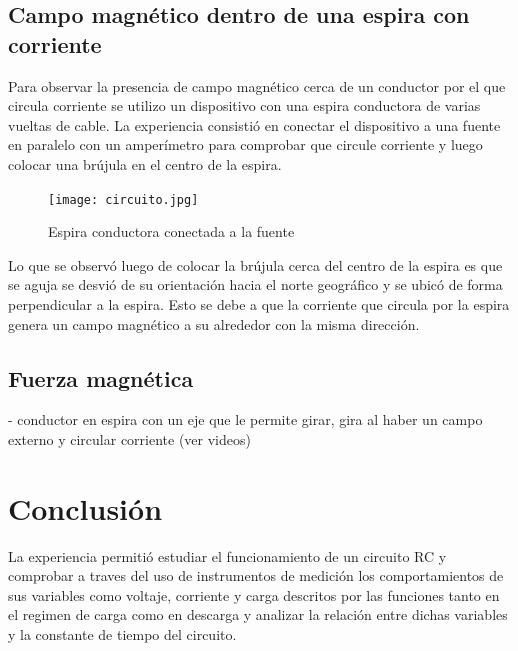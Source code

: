 \documentclass[11pt, letterpaper]{article}
\begin{document}
\subsection{Campo magnético dentro de una espira con corriente}
Para observar la presencia de campo magnético cerca de un conductor por
el que circula corriente se utilizo un dispositivo con una espira conductora
de varias vueltas de cable. La experiencia consistió en conectar el dispositivo
a una fuente en paralelo con un amperímetro para comprobar que circule corriente
y luego colocar una brújula en el centro de la espira.\\
\begin{figure}[h]
    \centering
    \texttt{[image: circuito.jpg]}
    \caption{Espira conductora conectada a la fuente}
\end{figure}
Lo que se observó luego de colocar la brújula cerca del centro de la espira es
que se aguja se desvió de su orientación hacia el norte geográfico y se ubicó
de forma perpendicular a la espira. Esto se debe a que la corriente que circula
por la espira genera un campo magnético a su alrededor con la misma dirección.

\subsection{Fuerza magnética}
- conductor en espira con un eje que le permite girar, gira al 
haber un campo externo y circular corriente (ver videos)

\pagebreak
\section{Conclusión}
La experiencia permitió estudiar el funcionamiento de un circuito
RC y comprobar a traves del uso de instrumentos de medición los
comportamientos de sus variables como voltaje, corriente y carga
descritos por las funciones tanto en el regimen de carga como en
descarga y analizar la relación entre dichas variables y la 
constante de tiempo del circuito.
\end{document}
